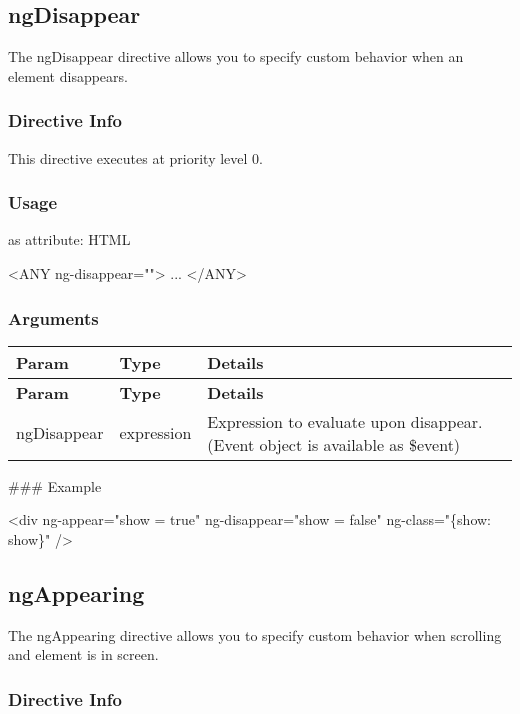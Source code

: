 \subsection*{ng\+Disappear}

The ng\+Disappear directive allows you to specify custom behavior when an element disappears.

\subsubsection*{Directive Info}

This directive executes at priority level 0.

\subsubsection*{Usage}

as attribute\+: H\+T\+ML 
\begin{DoxyCode}
<ANY
  ng-disappear="">
...
</ANY>
\end{DoxyCode}
 \subsubsection*{Arguments}

\tabulinesep=1mm
\begin{longtabu} spread 0pt [c]{*{3}{|X[-1]}|}
\hline
\rowcolor{\tableheadbgcolor}\textbf{ Param }&\textbf{ Type }&\textbf{ Details  }\\
\endfirsthead
\hline
\endfoot
\hline
\rowcolor{\tableheadbgcolor}\textbf{ Param }&\textbf{ Type }&\textbf{ Details  }\\
\endhead
ng\+Disappear &expression &Expression to evaluate upon disappear. (Event object is available as \$event) \\
\end{longtabu}
\#\#\# Example 
\begin{DoxyCode}
<div ng-appear="show = true" ng-disappear="show = false" ng-class="\{show: show\}" />
\end{DoxyCode}


\subsection*{ng\+Appearing}

The ng\+Appearing directive allows you to specify custom behavior when scrolling and element is in screen.

\subsubsection*{Directive Info}

